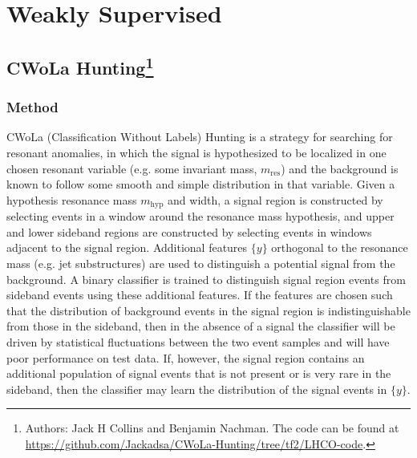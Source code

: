 \documentclass[a4paper,11pt]{article}
\begin{document}
 \FloatBarrier

\section{Weakly Supervised}
\label{sec:weaklysupervised}




\subsection[CWoLa Hunting]{CWoLa Hunting\footnote{Authors: Jack H Collins and Benjamin Nachman.  The code can be found at \url{https://github.com/Jackadsa/CWoLa-Hunting/tree/tf2/LHCO-code}.}}

\label{sec:cwola}

\subsubsection{Method}
\label{sec:method}

CWoLa (Classification Without Labels) Hunting is a strategy for searching for resonant anomalies, in which the signal is hypothesized to be localized in one chosen resonant variable (e.g. some invariant mass, $m_{\text{res}}$) and the background is known to follow some smooth and simple distribution in that variable. Given a hypothesis resonance mass $m_{\text{hyp}}$ and width, a signal region is constructed by selecting events in a window around the resonance mass hypothesis, and upper and lower sideband regions are constructed by selecting events in windows adjacent to the signal region. Additional features $\{y\}$ orthogonal to the resonance mass (e.g. jet substructures) are used to distinguish a potential signal from the background. A binary classifier is trained to distinguish signal region events from sideband events using these additional features. If the features are chosen such that the distribution of background events in the signal region is indistinguishable from those in the sideband, then in the absence of a signal the classifier will be driven by statistical fluctuations between the two event samples and will have poor performance on test data. If, however, the signal region contains an additional population of signal events that is not present or is very rare in the sideband, then the classifier may learn the distribution of the signal events in $\{y\}$.
\end{document}
